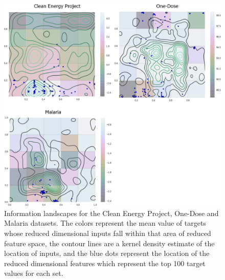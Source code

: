 \begin{figure}[htb]
\centering
\includegraphics[width=\columnwidth]{figures/info_landscape-tile/info_landscape-tile.png}
\caption{Information landscapes for the Clean Energy Project, One-Dose and Malaria datasets.  The colors represent the mean value of targets whose reduced dimensional inputs fall within that area of reduced feature space, the contour lines are a kernel density estimate of the location of inputs, and the blue dots represent the location of the reduced dimensional features which represent the top 100 target values for each set.}
\label{fig:info_landscapes}
\end{figure}
